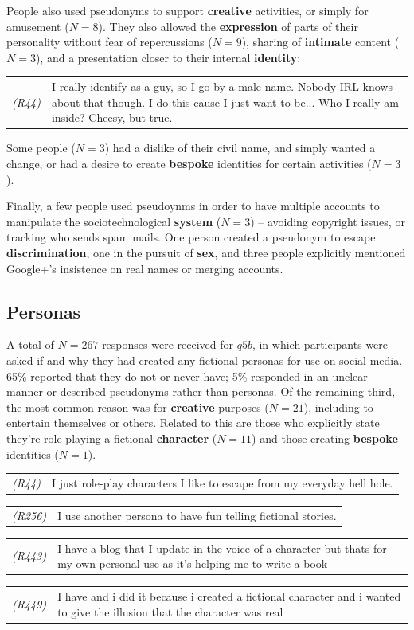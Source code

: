 \documentclass{sig-alternate}
\newcommand{\stag}[1]{\textbf{#1}}
\newcommand{\example}[2]{%

\vspace{0.10cm}

\hspace{-3.9ex} \begin{tabular}{ p{0.6cm} p{7.15cm} }
    {\it \small (R#1)} & #2 \\
\end{tabular}%
\vspace{0.10cm}

}
\begin{document}
People also used pseudonyms to support \stag{creative} activities, or simply for amusement ($N=8$). They also allowed the \stag{expression} of parts of their personality without fear of repercussions ($N=9$), sharing of \stag{intimate} content ($N=3$), and a presentation closer to their internal \stag{identity}:
\example{44}{I really identify as a guy, so I go by a male name.
Nobody IRL knows about that though.
I do this cause I just want to be... Who I really am inside?
Cheesy, but true.}
Some people ($N=3$) had a dislike of their civil name, and simply wanted a change, or had a desire to create \stag{bespoke} identities for certain activities ($N=3$).


Finally, a few people used pseudoynms in order to have multiple accounts to manipulate the sociotechnological \stag{system} ($N=3$) -- avoiding copyright issues, or tracking who sends spam mails.
One person created a pseudonym to escape \stag{discrimination}, one in the pursuit of \stag{sex}, and three people explicitly mentioned Google+'s insistence on real names or merging accounts.


\subsection{Personas}
\label{sec:personas}

A total of $N=267$ responses were received for $q5b$, in which participants were asked if and why they had created any fictional personas for use on social media. 65\% reported that they do not or never have; 5\% responded in an unclear manner or described pseudonyms rather than personas. Of the remaining third, the most common reason was for \stag{creative} purposes ($N=21$), including to entertain themselves or others. Related to this are those who explicitly state they're role-playing a fictional \stag{character} ($N=11$) and those creating \stag{bespoke} identities ($N=1$).

\example{44}{I just role-play characters I like to escape from my everyday hell hole.}

\example{256}{I use another persona to have fun telling fictional stories.}

\example{443}{I have a blog that I update in the voice of a character but thats for my own personal use as it's helping me to write a book}

\example{449}{I have and i did it because i created a fictional character and i wanted to give the illusion that the character was real}
\end{document}
